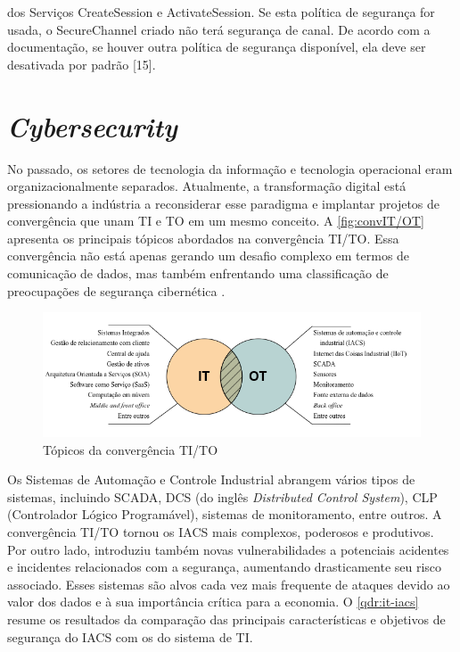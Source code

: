 dos Serviços CreateSession e ActivateSession. Se esta política de segurança for usada, o SecureChannel criado não terá segurança de canal. De acordo com a documentação, se houver outra política de segurança disponível, ela deve ser desativada por padrão [15].
        
    \section{\textit{Cybersecurity}} \label{sec:cybersecurity}

    No passado, os setores de tecnologia da informação e tecnologia operacional eram organizacionalmente separados. Atualmente, a transformação digital está pressionando a indústria a reconsiderar esse paradigma e implantar projetos de convergência que unam TI e TO em um mesmo conceito. A \autoref{fig:convIT/OT} apresenta os principais tópicos abordados na convergência TI/TO. Essa convergência não está apenas gerando um desafio complexo em termos de comunicação de dados, mas também enfrentando uma classificação de preocupações de segurança cibernética \cite{wiboonrat2022}.

    \begin{figure}[htbp]
        \caption{\label{fig:convIT/OT}Tópicos da convergência TI/TO}
        \begin{center}
            \includegraphics[width=1\textwidth]{USPSC-img/convergenceITOT-low.png}
        \end{center}
    \end{figure}

    Os Sistemas de Automação e Controle Industrial abrangem vários tipos de sistemas, incluindo SCADA, DCS (do inglês \textit{Distributed Control System}), CLP (Controlador Lógico Programável), sistemas de monitoramento, entre outros. A convergência TI/TO tornou os IACS mais complexos, poderosos e produtivos. Por outro lado, introduziu também novas vulnerabilidades a potenciais acidentes e incidentes relacionados com a segurança, aumentando drasticamente seu risco associado. Esses sistemas são alvos cada vez mais frequente de ataques devido ao valor dos dados e à sua importância crítica para a economia. O \autoref{qdr:it-iacs} resume os resultados da comparação das principais características e objetivos de segurança do IACS com os do sistema de TI.
    
